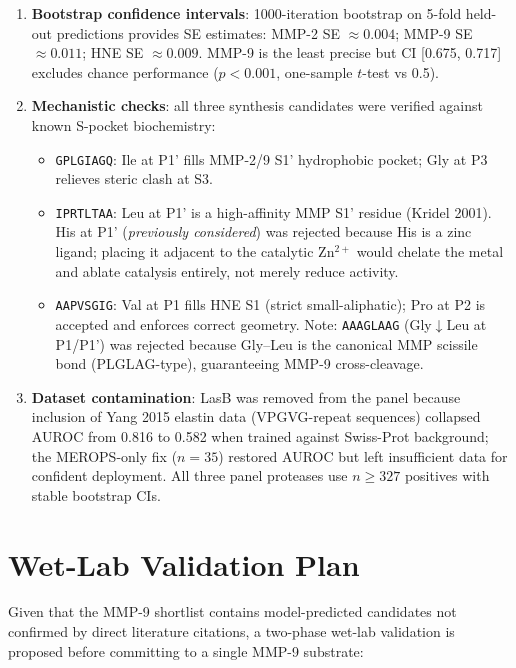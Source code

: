 \documentclass[10pt,a4paper]{article}
\newcommand{\seq}[1]{\texttt{#1}}
\begin{document}
\begin{enumerate}[leftmargin=*,label=\textbf{D\arabic*.},topsep=3pt,itemsep=3pt]
  \item \textbf{Bootstrap confidence intervals}: 1000-iteration bootstrap on
    5-fold held-out predictions provides SE estimates:
    MMP-2 SE $\approx 0.004$; MMP-9 SE $\approx 0.011$; HNE SE $\approx 0.009$.
    MMP-9 is the least precise but CI [0.675, 0.717] excludes chance
    performance ($p < 0.001$, one-sample $t$-test vs 0.5).

  \item \textbf{Mechanistic checks}: all three synthesis candidates were
    verified against known S-pocket biochemistry:
    \begin{itemize}[topsep=0pt,itemsep=0pt]
      \item \seq{GPLGIAGQ}: Ile at P1' fills MMP-2/9 S1' hydrophobic pocket;
        Gly at P3 relieves steric clash at S3.
      \item \seq{IPRTLTAA}: Leu at P1' is a high-affinity MMP S1' residue
        (Kridel 2001).  His at P1' (\emph{previously considered}) was rejected
        because His is a zinc ligand; placing it adjacent to the catalytic
        Zn$^{2+}$ would chelate the metal and ablate catalysis entirely, not
        merely reduce activity.
      \item \seq{AAPVSGIG}: Val at P1 fills HNE S1 (strict small-aliphatic);
        Pro at P2 is accepted and enforces correct geometry.
        Note: \seq{AAAGLAAG} (Gly$\downarrow$Leu at P1/P1') was rejected
        because Gly--Leu is the canonical MMP scissile bond (PLGLAG-type),
        guaranteeing MMP-9 cross-cleavage.
    \end{itemize}

  \item \textbf{Dataset contamination}: LasB was removed from the panel
    because inclusion of Yang 2015 elastin data (VPGVG-repeat sequences)
    collapsed AUROC from 0.816 to 0.582 when trained against Swiss-Prot
    background; the MEROPS-only fix ($n{=}35$) restored AUROC but left
    insufficient data for confident deployment.  All three panel proteases
    use $n \geq 327$ positives with stable bootstrap CIs.
\end{enumerate}

\section{Wet-Lab Validation Plan}

Given that the MMP-9 shortlist contains model-predicted candidates not
confirmed by direct literature citations, a two-phase wet-lab validation
is proposed before committing to a single MMP-9 substrate:
\end{document}
